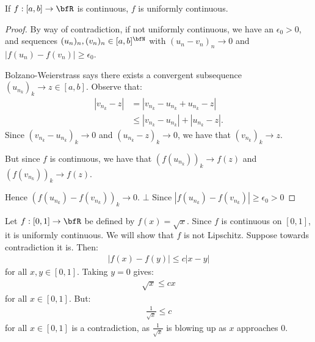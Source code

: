     \begin{theorem}
        If $f:[a,b] \rightarrow \bfR$ is continuous, $f$ is uniformly continuous.
    \end{theorem}
        \begin{proof}
            By way of contradiction, if not uniformly continuous, we have an $\epsilon_0 >0$, and sequences $(u_n)_n , (v_n)_n \in [a,b]^\bfN$ with $(u_n - v_n)_n \rightarrow 0$ and $|f(u_n) - f(v_n)| \geq \epsilon_0$. \nl
            
             Bolzano-Weierstrass says there exists a convergent subsequence $(u_{n_k})_k \rightarrow z \in [a,b]$. Observe that:
                \begin{equation*}
                \begin{split}
                    |v_{n_k} - z|
                    & = |v_{n_k} - u_{n_k} + u_{n_k} - z| \\
                    & \leq |v_{n_k} - u_{n_k} |+| u_{n_k} - z|.
                \end{split}
                \end{equation*}
            Since $(v_{n_k}-u_{n_k})_k \rightarrow 0$ and $(u_{n_k} - z)_k \rightarrow 0$, we have that $(v_{n_k})_k \rightarrow z$. \nl

            But since $f$ is continuous, we have that $(f(u_{n_k}))_k \rightarrow f(z)$ and $(f(v_{n_k}))_k \rightarrow f(z)$. \nl
            
            Hence $(f(u_{n_k}) - f(v_{n_k}))_k \rightarrow 0$. $\bot$ Since $|f(u_{n_k}) - f(v_{n_k})| \geq \epsilon_0 > 0$
        \end{proof}

    \begin{example}
        Let $f:[0,1] \rightarrow \bfR$ be defined by $f(x) = \sqrt{x}$. Since $f$ is continuous on $[0,1]$, it is uniformly continuous. We will show that $f$ is not Lipschitz. Suppose towards contradiction it is. Then:
            \begin{equation*}
            \begin{split}
                |f(x) - f(y)| \leq c|x-y|
            \end{split}
            \end{equation*}
        for all $x,y \in [0,1]$. Taking $y = 0$ gives:
            \begin{equation*}
            \begin{split}
                \sqrt{x} \leq cx
            \end{split}
            \end{equation*}
        for all $x \in [0,1]$. But:
            \begin{equation*}
            \begin{split}
                \frac{1}{\sqrt{x}} \leq c
            \end{split}
            \end{equation*}
        for all $x \in [0,1]$ is a contradiction, as $\frac{1}{\sqrt{x}}$ is blowing up as $x$ approaches 0.
    \end{example}

